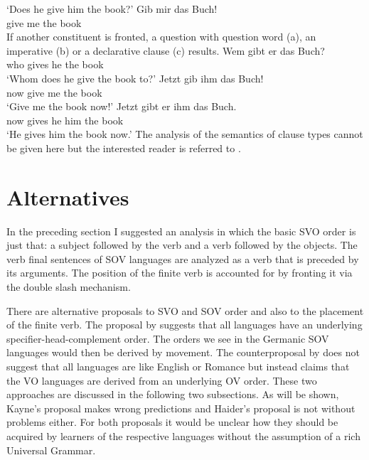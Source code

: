 \glt `Does he give him the book?'
\ex 
\gll Gib mir das Buch!\\
     give me the book\\
\zl
If another constituent is fronted, a question with question word (a), an imperative
(b) or a declarative clause (c) results.
\eal
\ex 
\gll Wem gibt er das Buch?\\
     who gives he the book\\
\glt `Whom does he give the book to?'
\ex 
\gll Jetzt gib ihm das Buch!\\
     now give me the book\\
\glt `Give me the book now!'
\ex 
\gll Jetzt gibt er ihm das Buch.\\
     now gives he him the book\\
\glt `He gives him the book now.'
\zl
The analysis of the semantics of clause types cannot be given here but the interested reader is
referred to .

\section{Alternatives}


In the preceding section I suggested an analysis in which the basic SVO order is just that: a
subject followed by the verb and a verb followed by the objects. The verb final sentences of SOV
languages are analyzed as a verb that is preceded by its arguments. The position of the finite verb
is accounted for by fronting it via the double slash mechanism.

There are alternative proposals to SVO and SOV order and also to the placement of the finite
verb. The proposal by \citet{Kayne94a-u} suggests that all languages have an underlying
specifier-head-complement order. The orders we see in the Germanic SOV languages would then be
derived by movement. The counterproposal by \citet{Haider2000a,Haider2020a} does not suggest that all languages are
like English or Romance but instead claims that the VO languages are derived from an underlying OV
order. These two approaches are discussed in the following two subsections. As will be shown,
Kayne's proposal makes wrong predictions and Haider's proposal is not without problems either. For
both proposals it would be unclear how they should be acquired by learners of the respective
languages without the assumption of a rich Universal Grammar.

